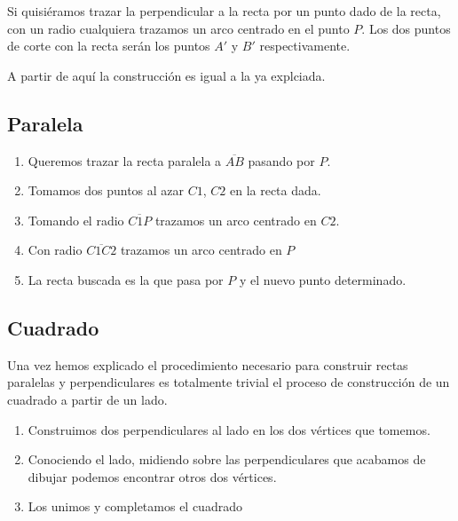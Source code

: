 \documentclass{apuntes}
\begin{document}
Si quisiéramos trazar la perpendicular a la recta por un punto dado de la recta, con un radio cualquiera trazamos un arco centrado en el punto $P$. Los dos puntos de corte con la recta serán los puntos $A'$ y $B'$ respectivamente.

A partir de aquí la construcción es igual a la ya explciada.

\subsection{Paralela}

\begin{minipage}{0.4\textwidth}
\begin{center}
\end{center}
\end{minipage}
\begin{minipage}{0.57\textwidth}
\begin{enumerate}
\item Queremos trazar la recta paralela a $\overline{AB}$ pasando por $P$.
\item Tomamos dos puntos al azar $C1$, $C2$ en la recta dada.
\item Tomando el radio $\overline{C1P}$ trazamos un arco centrado en $C2$.
\item Con radio $\overline{C1C2}$ trazamos un arco centrado en $P$
\item La recta buscada es la que pasa por $P$ y el nuevo punto determinado.
\end{enumerate}
\end{minipage}

\subsection{Cuadrado}
Una vez hemos explicado el procedimiento necesario para construir rectas paralelas y perpendiculares es totalmente trivial el proceso de construcción de un cuadrado a partir de un lado.

\begin{enumerate}
\item Construimos dos perpendiculares al lado en los dos vértices que tomemos.
\item Conociendo el lado, midiendo sobre las perpendiculares que acabamos de dibujar podemos encontrar otros dos vértices.
\item Los unimos y completamos el cuadrado
\end{enumerate}
\end{document}
